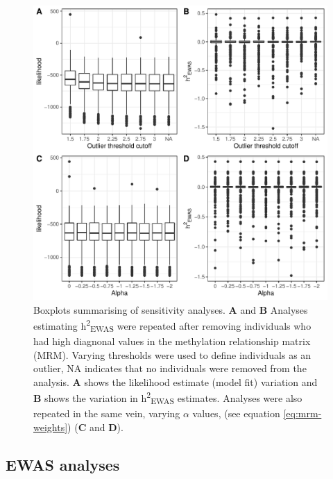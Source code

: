 \documentclass[11pt,oneside]{bristolthesis}
\begin{document}
\begin{figure}

{\centering \includegraphics[width=1\linewidth]{figure/05-h2ewas/sens_boxplots} 

}

\caption{Boxplots summarising of sensitivity analyses. \textbf{A} and \textbf{B} Analyses estimating h\textsuperscript{2}\textsubscript{EWAS} were repeated after removing individuals who had high diagnonal values in the methylation relationship matrix (MRM). Varying thresholds were used to define individuals as an outlier, NA indicates that no individuals were removed from the analysis. \textbf{A} shows the likelihood estimate (model fit) variation and \textbf{B} shows the variation in h\textsuperscript{2}\textsubscript{EWAS} estimates. Analyses were also repeated in the same vein, varying \(\alpha\) values, (see equation \eqref{eq:mrm-weights}) (\textbf{C} and \textbf{D}).}\label{fig:h2ewas-sens}
\end{figure}
\hypertarget{results-ewas-analyses-05}{%
\subsection{EWAS analyses}\label{results-ewas-analyses-05}}
\end{document}
